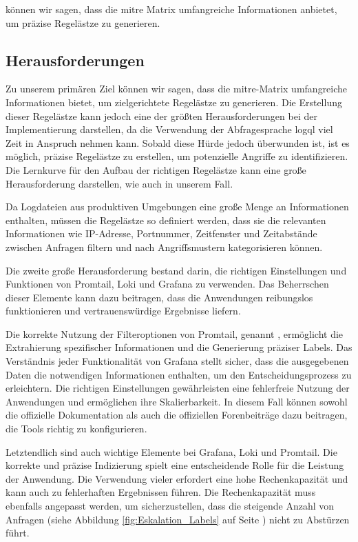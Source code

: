 können wir sagen, dass die \gls{mitre} Matrix umfangreiche Informationen anbietet, um präzise Regelästze zu generieren. 

\subsection{Herausforderungen}
Zu unserem primären Ziel können wir sagen, dass die \gls{mitre}-Matrix umfangreiche Informationen bietet, um zielgerichtete Regelästze zu generieren. Die Erstellung dieser Regelästze kann jedoch eine der größten Herausforderungen bei der Implementierung darstellen, da die Verwendung der Abfragesprache \gls{logql} viel Zeit in Anspruch nehmen kann. Sobald diese Hürde jedoch überwunden ist, ist es möglich, präzise Regelästze zu erstellen, um potenzielle Angriffe zu identifizieren. Die Lernkurve für den Aufbau der richtigen Regelästze kann eine große Herausforderung darstellen, wie auch in unserem Fall.

Da Logdateien aus produktiven Umgebungen eine große Menge an Informationen enthalten, müssen die Regelästze so definiert werden, dass sie die relevanten Informationen wie IP-Adresse, Portnummer, Zeitfenster und Zeitabstände zwischen Anfragen filtern und nach Angriffsmustern kategorisieren können.

Die zweite große Herausforderung bestand darin, die richtigen Einstellungen und Funktionen von Promtail, Loki und Grafana zu verwenden. Das Beherrschen dieser Elemente kann dazu beitragen, dass die Anwendungen reibungslos funktionieren und vertrauenswürdige Ergebnisse liefern.

Die korrekte Nutzung der Filteroptionen von Promtail, genannt , ermöglicht die Extrahierung spezifischer Informationen und die Generierung präziser Labels. Das Verständnis jeder Funktionalität von Grafana stellt sicher, dass die ausgegebenen Daten die notwendigen Informationen enthalten, um den Entscheidungsprozess zu erleichtern. Die richtigen Einstellungen gewährleisten eine fehlerfreie Nutzung der Anwendungen und ermöglichen ihre Skalierbarkeit. In diesem Fall können sowohl die offizielle Dokumentation als auch die offiziellen Forenbeiträge dazu beitragen, die Tools richtig zu konfigurieren.

Letztendlich sind  auch wichtige Elemente bei Grafana, Loki und Promtail. Die korrekte und präzise Indizierung spielt eine entscheidende Rolle für die Leistung der Anwendung. Die Verwendung vieler  erfordert eine hohe Rechenkapazität und kann auch zu fehlerhaften Ergebnissen führen. Die Rechenkapazität muss ebenfalls angepasst werden, um sicherzustellen, dass die steigende Anzahl von Anfragen (siehe Abbildung \ref{fig:Eskalation_Labels} auf Seite \pageref{fig:Eskalation_Labels}) nicht zu Abstürzen führt.

